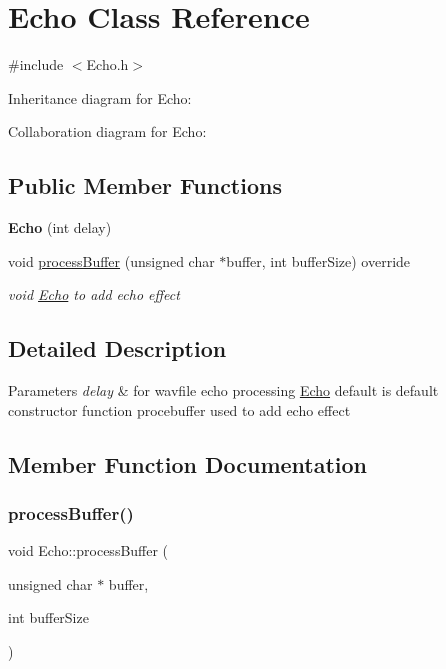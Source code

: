\hypertarget{classEcho}{}\section{Echo Class Reference}
\label{classEcho}


{\ttfamily \#include $<$Echo.\+h$>$}



Inheritance diagram for Echo\+:


Collaboration diagram for Echo\+:
\subsection*{Public Member Functions}
\begin{DoxyCompactItemize}
\item 
\mbox{\label{classEcho_a9531515ffab8be1e38cbdc0e0e9338a6}} 
{\bfseries Echo} (int delay)
\item 
void \hyperlink{classEcho_ae915d9d4065a34411d18791a5ae9006b}{process\+Buffer} (unsigned char $\ast$buffer, int buffer\+Size) override
\begin{DoxyCompactList}\small\item\em void \hyperlink{classEcho}{Echo} to add echo effect \end{DoxyCompactList}\end{DoxyCompactItemize}


\subsection{Detailed Description}

\begin{DoxyParams}{Parameters}
{\em delay} & for wavfile echo processing \hyperlink{classEcho}{Echo} default is default constructor function procebuffer used to add echo effect \\
\hline
\end{DoxyParams}


\subsection{Member Function Documentation}
\mbox{\label{classEcho_ae915d9d4065a34411d18791a5ae9006b}} 
\subsubsection{\texorpdfstring{process\+Buffer()}{processBuffer()}}
{\footnotesize\ttfamily void Echo\+::process\+Buffer (\begin{DoxyParamCaption}\item[{unsigned char $\ast$}]{buffer,  }\item[{int}]{buffer\+Size }\end{DoxyParamCaption})\hspace{0.3cm}{\ttfamily [override]}}



